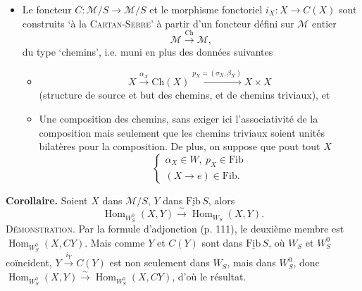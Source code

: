 \documentclass[11pt]{article}
\newcommand{\printedpage}[1]{\marginpar{\footnotesize p.~#1}}
\newcommand{\msp}[1]{\marginpar{\footnotesize [#1]}}
\newcommand{\Hom}{\operatorname{Hom}}
\newcommand{\Fib}{\underline{\mathrm{Fib}}\,}
\newcommand{\M}{\mathcal{M}}
\begin{document}
\begin{itemize}[leftmargin=3em]
\item[A$'$)] Le foncteur $C : \M/S \longrightarrow \M/S$ et le morphisme fonctoriel $i_X : X \longrightarrow C(X)$ sont construits ‘à la \textsc{Cartan-Serre}’ à partir d'un foncteur défini sur $\M$ entier
\[\M \xrightarrow{\mathrm{Ch}} \M,\]
du type ‘chemins’, i.e. muni en plus des données suivantes
\begin{itemize}[leftmargin=3em]
\item[a)] \[X \xrightarrow{\alpha_X} \mathrm{Ch}(X) \xrightarrow{p_X = (\sigma_X, \beta_X)} X \times X\]
(structure de source et but des chemins, et de chemins triviaux), et
\item[b)] Une composition des chemins, sans exiger ici l'associativité de la composition mais seulement que les chemins triviaux soient unités bilatères pour la composition. De plus, on suppose que pout tout $X$ %
\[\begin{cases} \alpha_X \in W,\ p_X \in \mathrm{Fib} \\ (X \longrightarrow e) \in \mathrm{Fib}. \end{cases}\]
\end{itemize}
\end{itemize}

\printedpage{71}
\msp{page 113}
\textbf{Corollaire.} Soient $X$ dans $\M/S$, $Y$ dans $\Fib S$, alors
\[\Hom_{W_S^0}(X, Y) \xrightarrow{\sim} \Hom_{W_S}(X, Y).\]
\textsc{Démonstration}. Par la formule d'adjonction (p. 111), le deuxième membre est $\Hom_{W_S^0}(X, CY)$. Mais comme $Y$ et $C(Y)$ sont dans $\Fib S$, où $W_S$ et $W_S^0$ coïncident, $Y \xrightarrow{i_Y} C(Y)$ est non seulement dans $W_S$, mais dans $W_S^0$, donc $\Hom_{W_S^0}(X, Y) \xrightarrow{\sim} \Hom_{W_S^0}(X, CY)$, d'où le résultat.
\end{document}

